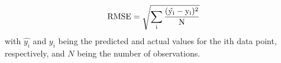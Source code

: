 $$\rm{RMSE}=\sqrt{\sum\limits_{i}\frac{(\hat{y_i}-y_i)^2}{N}}$$
with $\hat{y_i}$ and $y_i$ being the predicted and actual values for the ith data point, respectively, and $N$ being the number of observations.